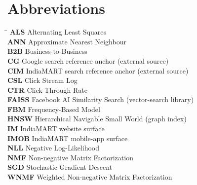 \chapter*{Abbreviations}

\begin{tabbing}
\hspace*{3cm}\=\kill
\textbf{ALS}   \> Alternating Least Squares \\
\textbf{ANN}   \> Approximate Nearest Neighbour \\
\textbf{B2B}   \> Business-to-Business \\
\textbf{CG}    \> Google search reference anchor (external source) \\
\textbf{CIM}   \> IndiaMART search reference anchor (external source) \\
\textbf{CSL}   \> Click Stream Log \\
\textbf{CTR}   \> Click-Through Rate \\
\textbf{FAISS} \> Facebook AI Similarity Search (vector-search library) \\
\textbf{FBM}   \> Frequency-Based Model \\
\textbf{HNSW}  \> Hierarchical Navigable Small World (graph index) \\
\textbf{IM}    \> IndiaMART website surface \\
\textbf{IMOB}  \> IndiaMART mobile-app surface \\
\textbf{NLL}   \> Negative Log-Likelihood \\
\textbf{NMF}   \> Non-negative Matrix Factorization \\
\textbf{SGD}   \> Stochastic Gradient Descent \\
\textbf{WNMF}  \> Weighted Non-negative Matrix Factorization \\
\end{tabbing}
